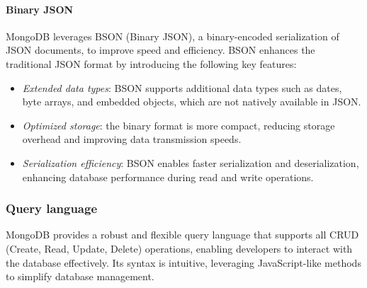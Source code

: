 \paragraph*{Binary JSON} 
MongoDB leverages BSON (Binary JSON), a binary-encoded serialization of JSON documents, to improve speed and efficiency. 
BSON enhances the traditional JSON format by introducing the following key features:
\begin{itemize} 
    \item \textit{Extended data types}: BSON supports additional data types such as dates, byte arrays, and embedded objects, which are not natively available in JSON. 
    \item \textit{Optimized storage}: the binary format is more compact, reducing storage overhead and improving data transmission speeds. 
    \item \textit{Serialization efficiency}: BSON enables faster serialization and deserialization, enhancing database performance during read and write operations. 
\end{itemize}

























\subsubsection{Query language}
MongoDB provides a robust and flexible query language that supports all CRUD (Create, Read, Update, Delete) operations, enabling developers to interact with the database effectively. 
Its syntax is intuitive, leveraging JavaScript-like methods to simplify database management.

